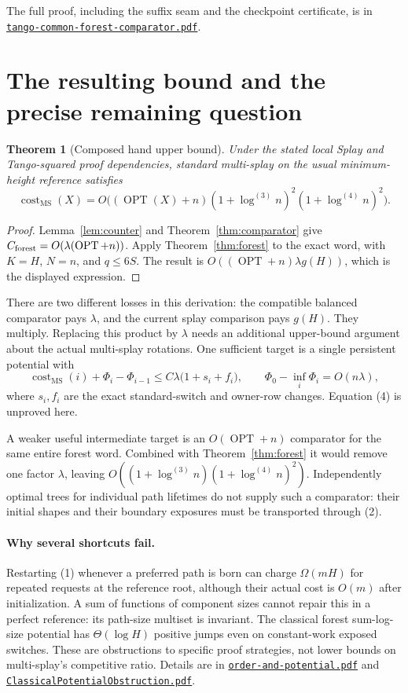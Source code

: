\documentclass[11pt]{article}
\newtheorem{theorem}{Theorem}
\newcommand{\OPT}{\operatorname{OPT}}
\newcommand{\cost}{\operatorname{cost}}
\newcommand{\MS}{\operatorname{MS}}
\newcommand{\lgit}[1]{\log^{(#1)}}
\begin{document}
The full proof, including the suffix seam and the checkpoint certificate,
is in \href{tango-common-forest-comparator.pdf}{\texttt{tango-common-forest-comparator.pdf}}.

\section{The resulting bound and the precise remaining question}

\begin{theorem}[Composed hand upper bound]\label{thm:main}
Under the stated local Splay and Tango-squared proof dependencies,
standard multi-splay on the usual minimum-height reference satisfies
\[
 \boxed{\displaystyle
 \cost_{\MS}(X)=
 O\bigl((\OPT(X)+n)(1+\lgit{3}n)^2(1+\lgit{4}n)^2\bigr).}
\]
\end{theorem}

\begin{proof}
Lemma~\ref{lem:counter} and Theorem~\ref{thm:comparator} give
$C_{\rm forest}=O(\lambda(\OPT+n))$.
Apply Theorem~\ref{thm:forest} to the exact word, with $K=H$,
$N=n$, and $q\le6S$. The result is
$O((\OPT+n)\lambda g(H))$, which is the displayed expression.
\end{proof}

There are two different losses in this derivation: the compatible
balanced comparator pays $\lambda$, and the current splay comparison
pays $g(H)$. They multiply. Replacing this product by $\lambda$ needs
an additional upper-bound argument about the actual multi-splay
rotations. One sufficient target is a single persistent potential with
\[
 \cost_{\MS}(i)+\Phi_i-\Phi_{i-1}
 \le C\lambda\bigl(1+s_i+f_i\bigr),\qquad
 \Phi_0-\inf_i\Phi_i=O(n\lambda),                       \tag{4}
\]
where $s_i,f_i$ are the exact standard-switch and owner-row changes.
Equation (4) is unproved here.

A weaker useful intermediate target is an $O(\OPT+n)$ comparator
for the same entire forest word. Combined with Theorem~\ref{thm:forest}
it would remove one factor $\lambda$, leaving
$O((1+\lgit{3}n)(1+\lgit{4}n)^2)$. Independently optimal trees for
individual path lifetimes do not supply such a comparator: their initial
shapes and their boundary exposures must be transported through (2).

\paragraph{Why several shortcuts fail.}
Restarting (1) whenever a preferred path is born can charge
$\Omega(mH)$ for repeated requests at the reference root, although
their actual cost is $O(m)$ after initialization. A sum of functions of
component sizes cannot repair this in a perfect reference: its path-size
multiset is invariant. The classical forest sum-log-size potential has
$\Theta(\log H)$ positive jumps even on constant-work exposed switches.
These are obstructions to specific proof strategies, not lower bounds
on multi-splay's competitive ratio. Details are in
\href{order-and-potential.pdf}{\texttt{order-and-potential.pdf}} and
\href{ClassicalPotentialObstruction.pdf}{\texttt{ClassicalPotentialObstruction.pdf}}.
\end{document}
